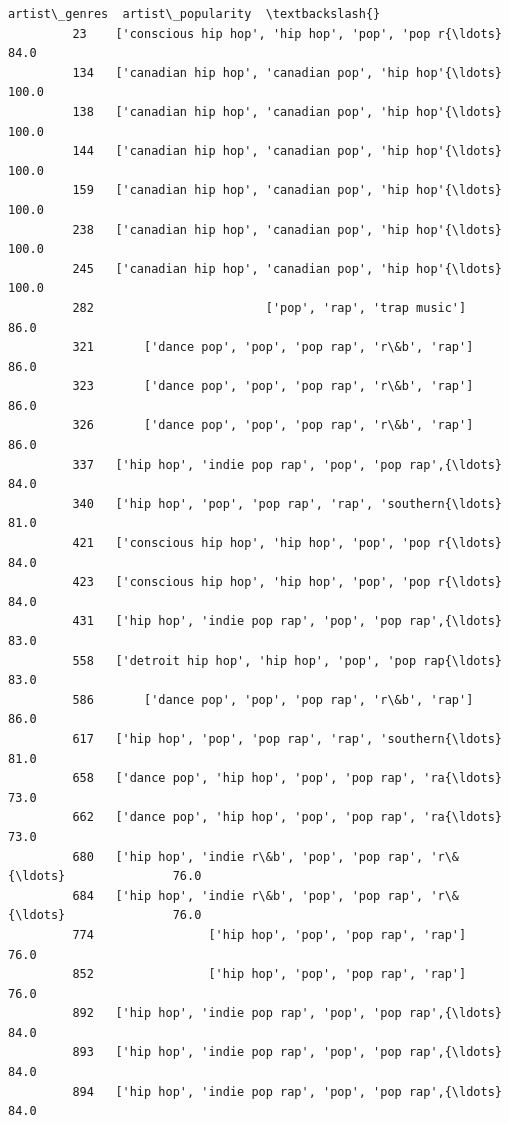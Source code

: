 \documentclass[11pt]{article}
\begin{document}
\begin{Verbatim}[commandchars=\\\{\}]
                                                   artist\_genres  artist\_popularity  \textbackslash{}
         23    ['conscious hip hop', 'hip hop', 'pop', 'pop r{\ldots}               84.0   
         134   ['canadian hip hop', 'canadian pop', 'hip hop'{\ldots}              100.0   
         138   ['canadian hip hop', 'canadian pop', 'hip hop'{\ldots}              100.0   
         144   ['canadian hip hop', 'canadian pop', 'hip hop'{\ldots}              100.0   
         159   ['canadian hip hop', 'canadian pop', 'hip hop'{\ldots}              100.0   
         238   ['canadian hip hop', 'canadian pop', 'hip hop'{\ldots}              100.0   
         245   ['canadian hip hop', 'canadian pop', 'hip hop'{\ldots}              100.0   
         282                        ['pop', 'rap', 'trap music']               86.0   
         321       ['dance pop', 'pop', 'pop rap', 'r\&b', 'rap']               86.0   
         323       ['dance pop', 'pop', 'pop rap', 'r\&b', 'rap']               86.0   
         326       ['dance pop', 'pop', 'pop rap', 'r\&b', 'rap']               86.0   
         337   ['hip hop', 'indie pop rap', 'pop', 'pop rap',{\ldots}               84.0   
         340   ['hip hop', 'pop', 'pop rap', 'rap', 'southern{\ldots}               81.0   
         421   ['conscious hip hop', 'hip hop', 'pop', 'pop r{\ldots}               84.0   
         423   ['conscious hip hop', 'hip hop', 'pop', 'pop r{\ldots}               84.0   
         431   ['hip hop', 'indie pop rap', 'pop', 'pop rap',{\ldots}               83.0   
         558   ['detroit hip hop', 'hip hop', 'pop', 'pop rap{\ldots}               83.0   
         586       ['dance pop', 'pop', 'pop rap', 'r\&b', 'rap']               86.0   
         617   ['hip hop', 'pop', 'pop rap', 'rap', 'southern{\ldots}               81.0   
         658   ['dance pop', 'hip hop', 'pop', 'pop rap', 'ra{\ldots}               73.0   
         662   ['dance pop', 'hip hop', 'pop', 'pop rap', 'ra{\ldots}               73.0   
         680   ['hip hop', 'indie r\&b', 'pop', 'pop rap', 'r\&{\ldots}               76.0   
         684   ['hip hop', 'indie r\&b', 'pop', 'pop rap', 'r\&{\ldots}               76.0   
         774                ['hip hop', 'pop', 'pop rap', 'rap']               76.0   
         852                ['hip hop', 'pop', 'pop rap', 'rap']               76.0   
         892   ['hip hop', 'indie pop rap', 'pop', 'pop rap',{\ldots}               84.0   
         893   ['hip hop', 'indie pop rap', 'pop', 'pop rap',{\ldots}               84.0   
         894   ['hip hop', 'indie pop rap', 'pop', 'pop rap',{\ldots}               84.0   

\end{Verbatim}
\end{document}
